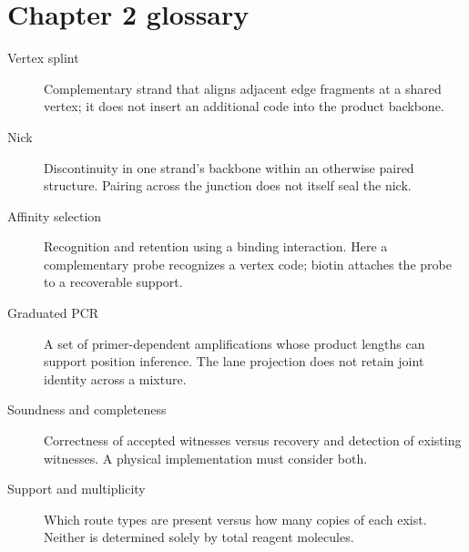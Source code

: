 \chapter*{Chapter 2 glossary}
\begin{description}
\item[Vertex splint] Complementary strand that aligns adjacent edge fragments at a shared vertex; it does not insert an additional code into the product backbone.
\item[Nick] Discontinuity in one strand's backbone within an otherwise paired structure. Pairing across the junction does not itself seal the nick.
\item[Affinity selection] Recognition and retention using a binding interaction. Here a complementary probe recognizes a vertex code; biotin attaches the probe to a recoverable support.
\item[Graduated PCR] A set of primer-dependent amplifications whose product lengths can support position inference. The lane projection does not retain joint identity across a mixture.
\item[Soundness and completeness] Correctness of accepted witnesses versus recovery and detection of existing witnesses. A physical implementation must consider both.
\item[Support and multiplicity] Which route types are present versus how many copies of each exist. Neither is determined solely by total reagent molecules.
\end{description}

